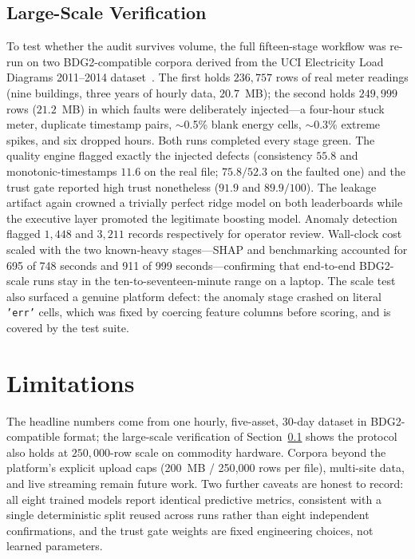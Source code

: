 \documentclass[conference]{IEEEtran}
\begin{document}
\subsection{Large-Scale Verification}\label{sec:scale}

To test whether the audit survives volume, the full fifteen-stage workflow was re-run on two BDG2-compatible corpora derived from the UCI Electricity Load Diagrams 2011--2014 dataset~\cite{uci:load:2014}. The first holds $236{,}757$ rows of real meter readings (nine buildings, three years of hourly data, $20.7$~MB); the second holds $249{,}999$ rows ($21.2$~MB) in which faults were deliberately injected---a four-hour stuck meter, duplicate timestamp pairs, $\sim$0.5\% blank energy cells, $\sim$0.3\% extreme spikes, and six dropped hours. Both runs completed every stage green. The quality engine flagged exactly the injected defects (consistency $55.8$ and monotonic-timestamps $11.6$ on the real file; $75.8/52.3$ on the faulted one) and the trust gate reported high trust nonetheless ($91.9$ and $89.9/100$). The leakage artifact again crowned a trivially perfect ridge model on both leaderboards while the executive layer promoted the legitimate boosting model. Anomaly detection flagged $1{,}448$ and $3{,}211$ records respectively for operator review. Wall-clock cost scaled with the two known-heavy stages---SHAP and benchmarking accounted for 695 of 748 seconds and 911 of 999 seconds---confirming that end-to-end BDG2-scale runs stay in the ten-to-seventeen-minute range on a laptop. The scale test also surfaced a genuine platform defect: the anomaly stage crashed on literal \texttt{'err'} cells, which was fixed by coercing feature columns before scoring, and is covered by the test suite.

\section{Limitations}

The headline numbers come from one hourly, five-asset, 30-day dataset in BDG2-compatible format; the large-scale verification of Section~\ref{sec:scale} shows the protocol also holds at $250{,}000$-row scale on commodity hardware. Corpora beyond the platform's explicit upload caps (200~MB / 250{,}000 rows per file), multi-site data, and live streaming remain future work. Two further caveats are honest to record: all eight trained models report identical predictive metrics, consistent with a single deterministic split reused across runs rather than eight independent confirmations, and the trust gate weights are fixed engineering choices, not learned parameters.
\end{document}
